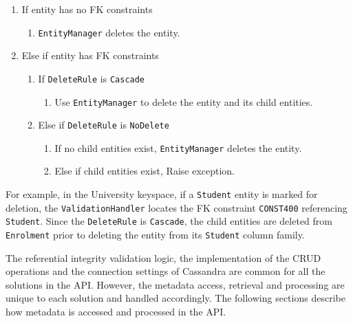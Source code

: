 \begin{description}
		\begin{enumerate}
		  \item If entity has no \ac{FK} constraints 
		  		\begin{enumerate}
				  \item \texttt{EntityManager} deletes the entity. 
				\end{enumerate}
		  \item Else if entity has \ac{FK} constraints 
				\begin{enumerate}
		  		  \item If \texttt{DeleteRule} is \texttt{Cascade}
		  		 		\begin{enumerate}
		  		 		   \item Use \texttt{EntityManager}
		  		 		   to delete the entity and its child entities. 
		  		 		\end{enumerate}
		  		  \item Else if \texttt{DeleteRule}  is \texttt{NoDelete}
						\begin{enumerate}
						  \item If no child entities exist,
						  		   \texttt{EntityManager} deletes the entity. 
						  \item Else if child entities exist,
						    		 Raise exception.  
						\end{enumerate}
		  		\end{enumerate}
		\end{enumerate}	
		For example,   in the University keyspace,   if a 
		\texttt{Student} entity is marked for
		deletion,  the \texttt{ValidationHandler} locates the \ac{FK} constraint 
		\texttt{CONST400} referencing \texttt{Student}. 
		Since the \texttt{DeleteRule} is \texttt{Cascade},  
		the child entities are deleted from \texttt{Enrolment} prior to deleting the
		entity from its \texttt{Student} column family.  
	\end{description}
		
	The referential integrity validation logic,  the implementation of the \ac{CRUD}
	operations and the connection settings of Cassandra  are common for
	all the solutions in the \ac{API}.  However,  the metadata access,  retrieval and
	processing are unique to each solution and handled accordingly.  The following
	sections describe how metadata is  
	accessed and processed in the \ac{API}. 

